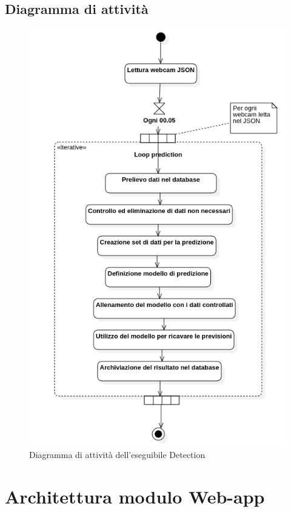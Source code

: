 \subsection{Diagramma di attività}
\begin{figure}[H]
  \begin{center}
    \includegraphics[scale=0.6]{../immagini/diag_PB/prediction_activity.png}
    \caption{Diagramma di attività dell'eseguibile Detection}
  \end{center}
\end{figure}



\section{Architettura modulo Web-app}
